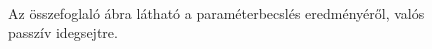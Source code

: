 \begin{figure}[h!]
	\centering
	\\
	\caption[Valós kísérleti adatsoron végzett inferencia összefoglaló ábrája]{Az összefoglaló ábra látható a paraméterbecslés eredményéről, valós passzív idegsejtre.}
	\label{fig:fullplot_res}
\end{figure}

